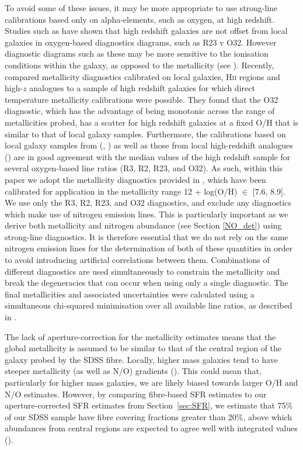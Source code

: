 \documentclass[usenatbib]{mnras} %
\begin{document}
To avoid some of these issues, it may be more appropriate to use strong-line calibrations based only on alpha-elements, such as oxygen, at high redshift. Studies such as \cite{Shapley_2015} have shown that high redshift galaxies are not offset from local galaxies in oxygen-based diagnostics diagrams, such as R23  v O32. However diagnostic diagrams such as these may be more sensitive to the ionisation conditions within the galaxy, as opposed to the metallicity (see \citealt{Strom_2018}). Recently, \cite{Sanders_2020OH} compared metallicity diagnostics calibrated on local galaxies, \textsc{Hii} regions and high-$z$ analogues to a sample of high redshift galaxies for which direct temperature metallicity calibrations were possible. They found that the O32 diagnostic, which has the advantage of being monotonic across the range of metallicities probed, has a scatter for high redshift galaxies at a fixed O/H that is similar to that of local galaxy samples. Furthermore, the calibrations based on local galaxy samples from \citeauthor{Curti_2017} (\citeyear{Curti_2017}, \citeyear{Curti_2020FMR}) as well as those from local high-redshift analogues (\citealt{Bian_2018}) are in good agreement with the median values of the high redshift sample for several oxygen-based line ratios (R3, R2, R23, and O32). As such, within this paper we adopt the metallicity diagnostics provided in \cite{Curti_2020FMR}, which have been calibrated for application in the metallicity range 12 + log(O/H) $\in$ [7.6, 8.9]. We use only the R3, R2, R23, and O32 diagnostics, and exclude any diagnostics which make use of nitrogen emission lines. This is particularly important as we derive both metallicity and nitrogen abundance (see Section \ref{NO_det}) using strong-line diagnostics. It is therefore essential that we do not rely on the same nitrogen emission lines for the determination of both of these quantities in order to avoid introducing artificial correlations between them. Combinations of different diagnostics are used simultaneously to constrain the metallicity and break the degeneracies that can occur when using only a single diagnostic. The final metallicities and associated uncertainties were calculated using a simultaneous chi-squared minimisation over all available line ratios, as described in \cite{ Curti_2020}.  

The lack of aperture-correction for the metallicity estimates means that the global metallicity is assumed to be similar to that of the central region of the galaxy probed by the SDSS fibre. Locally, higher mass galaxies tend to have steeper metallicity (as well as N/O) gradients (\citealt{Belfiore_2017}). This could mean that, particularly for higher mass galaxies, we are likely biased towards larger O/H and N/O estimates. However, by comparing fibre-based SFR estimates to our aperture-corrected SFR estimates from Section~\ref{sec:SFR}, we estimate that 75\% of our SDSS sample have fibre covering fractions greater than 20\%, above which abundances from central regions are expected to agree well with integrated values (\citealt{Kewley_2005}).
\end{document}
